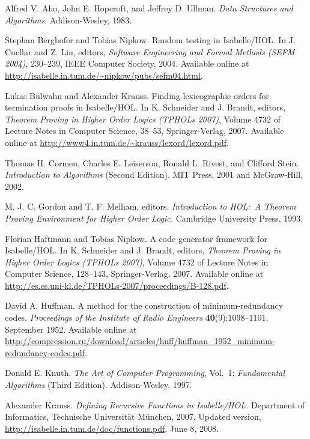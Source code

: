 \documentclass[11pt,a4paper]{article}
\begin{document}
\begin{thebibliography}{[9]}

 Alfred V. Aho, John E. Hopcroft, and Jeffrey D.
Ullman. \textsl{Data Structures and Algorithms}. Addison-Wesley, 1983.

 Stephan Berghofer and Tobias Nipkow.
Random testing in Isabelle/HOL. In J. Cuellar and Z. Liu, editors,
{\sl Software Engineering and Formal Methods (SEFM 2004)}, 230--239,
IEEE Computer Society, 2004. Available online at
\url{http://isabelle.in.tum.de/~nipkow/pubs/sefm04.html}.

 Lukas Bulwahn and Alexander Krauss.
Finding lexicographic orders for termination proofs in Isabelle/HOL.
In K. Schneider and J. Brandt, editors,
{\sl Theorem Proving in Higher Order Logics (TPHOLs 2007)},
Volume 4732 of Lecture Notes in Computer Science, 38--53, Springer-Verlag,
2007. Available online at
\url{http://www4.in.tum.de/~krauss/lexord/lexord.pdf}.

 Thomas H. Cormen, Charles E. Leiserson,
Ronald L. Rivest, and Clifford Stein. {\sl Introduction to Algorithms\/}
(Second Edition). MIT Press, 2001 and McGraw-Hill, 2002.

 M. J. C. Gordon and T. F. Melham, editors.
{\sl Introduction to HOL:\ A Theorem Proving Environment for Higher Order
Logic.} Cambridge University Press, 1993.

 Florian Haftmann and Tobias Nipkow.
A code generator framework for Isabelle/HOL. In K. Schneider and J. Brandt,
editors, {\sl Theorem Proving in Higher Order Logics (TPHOLs 2007)},
Volume 4732 of Lecture Notes in Computer Science, 128--143, Springer-Verlag,
2007. Available online at
\url{http://es.cs.uni-kl.de/TPHOLs-2007/proceedings/B-128.pdf}.

 David A. Huffman. A method for the construction of
minimum-redundancy codes. {\sl Proceedings of the Institute of Radio Engineers}
{\bf 40}(9):1098--1101, September 1952. Available online at
\url{http://compression.ru/download/articles/huff/huffman_1952_minimum-redundancy-codes.pdf}.

 Donald E. Knuth. {\sl The Art of Computer Programming},
Vol.~1: {\sl Fundamental Algorithms\/} (Third Edition). Addison-Wesley, 1997.

 Alexander Krauss. {\sl Defining Recursive Functions in
Isabelle/HOL.} Department of Informatics, Technische Universit\"at M\"unchen,
2007. Updated version, \url{http://isabelle.in.tum.de/doc/functions.pdf},
June 8, 2008.


\end{thebibliography}
\end{document}
